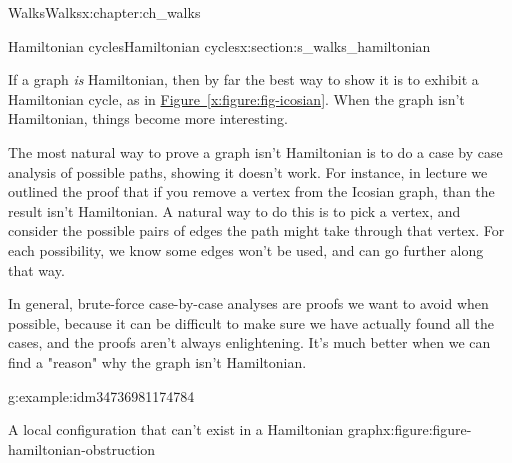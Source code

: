 \documentclass[oneside,10pt,]{book}
\newcommand{\xreffont}{\relax}
\numberwithin{equation}{section}
\begin{document}
\begin{chapterptx}{Walks}{}{Walks}{}{}{x:chapter:ch_walks}
\begin{sectionptx}{Hamiltonian cycles}{}{Hamiltonian cycles}{}{}{x:section:s_walks_hamiltonian}
\par
If a graph \emph{is} Hamiltonian, then by far the best way to show it is to exhibit a Hamiltonian cycle, as in \hyperref[x:figure:fig-icosian]{Figure~{\xreffont\ref{x:figure:fig-icosian}}}.  When the graph isn't Hamiltonian, things become more interesting.%
\par
The most natural way to prove a graph isn't Hamiltonian is to do a case by case analysis of possible paths, showing it doesn't work.  For instance, in lecture we outlined the proof that if you remove a vertex from the Icosian graph, than the result isn't Hamiltonian.  A natural way to do this is to pick a vertex, and consider the possible pairs of edges the path might take through that vertex.  For each possibility, we know some edges won't be used, and can go further along that way.%
\par
In general, brute-force case-by-case analyses are proofs we want to avoid when possible, because it can be difficult to make sure we have actually found all the cases, and the proofs aren't always enlightening.  It's much better when we can find a "reason" why the graph isn't Hamiltonian.%
\begin{example}{}{g:example:idm34736981174784}%
\begin{figureptx}{A local configuration that can't exist in a Hamiltonian graph}{x:figure:figure-hamiltonian-obstruction}{}%
\begin{image}{0.15}{0.7}{0.15}%
\end{image}
\end{figureptx}
\end{example}
\end{sectionptx}
\end{chapterptx}
\end{document}
